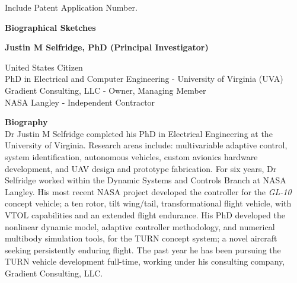 \documentclass[11pt]{article}
\newcommand{\PubSpace}{\vspace{-0.12cm}}  %
\begin{document}
%
%
%
%
%
%

Include Patent Application Number.








\newpage
{\bf \Huge Biographical Sketches}


\vspace{0.2cm}
{\bf \Large Justin M Selfridge, PhD (Principal Investigator)}

United States Citizen \\
PhD in Electrical and Computer 
Engineering - University of Virginia (UVA) \\
Gradient Consulting, LLC - Owner, Managing Member \\
NASA Langley - Independent Contractor


{\bf Biography} \\
Dr Justin M Selfridge completed his PhD in Electrical Engineering at the University of Virginia.  Research areas include: multivariable adaptive control, system identification, autonomous vehicles, custom avionics hardware development, and UAV design and prototype fabrication.  For six years, Dr Selfridge worked within the Dynamic Systems and Controls Branch at NASA Langley.  His most recent NASA project developed the controller for the \emph{GL-10} concept vehicle; a ten rotor, tilt wing/tail, transformational flight vehicle, with VTOL capabilities and an extended flight endurance.  His PhD developed the nonlinear dynamic model, adaptive controller methodology, and numerical multibody simulation tools, for the TURN concept system; a novel aircraft seeking persistently enduring flight.  The past year he has been pursuing the TURN vehicle development full-time, working under his consulting company, Gradient Consulting, LLC.
\end{document}
